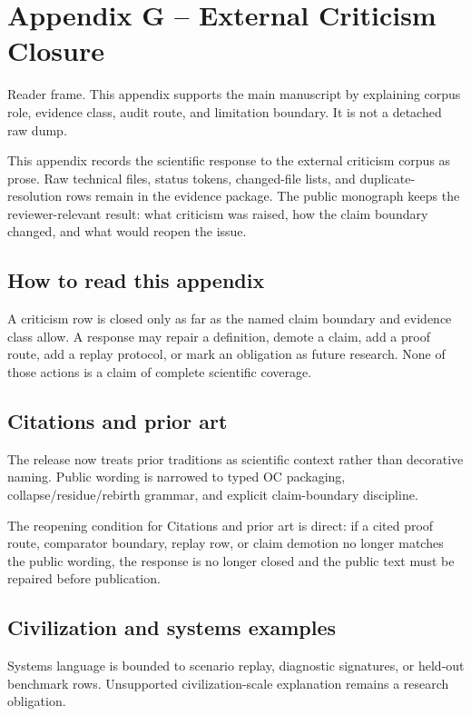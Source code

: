 \section{Appendix G -- External Criticism Closure}
Reader frame. This appendix supports the main manuscript by explaining corpus role, evidence class, audit route, and limitation boundary. It is not a detached raw dump.


\label{sec:oc13-external-criticism-closure}

This appendix records the scientific response to the external criticism corpus as prose. Raw technical files, status tokens, changed-file lists, and duplicate-resolution rows remain in the evidence package. The public monograph keeps the reviewer-relevant result: what criticism was raised, how the claim boundary changed, and what would reopen the issue.


\subsection{How to read this appendix}

A criticism row is closed only as far as the named claim boundary and evidence class allow. A response may repair a definition, demote a claim, add a proof route, add a replay protocol, or mark an obligation as future research. None of those actions is a claim of complete scientific coverage.


\subsection{Citations and prior art}

The release now treats prior traditions as scientific context rather than decorative naming. Public wording is narrowed to typed OC packaging, collapse/residue/rebirth grammar, and explicit claim-boundary discipline.


The reopening condition for Citations and prior art is direct: if a cited proof route, comparator boundary, replay row, or claim demotion no longer matches the public wording, the response is no longer closed and the public text must be repaired before publication.


\subsection{Civilization and systems examples}

Systems language is bounded to scenario replay, diagnostic signatures, or held-out benchmark rows. Unsupported civilization-scale explanation remains a research obligation.


